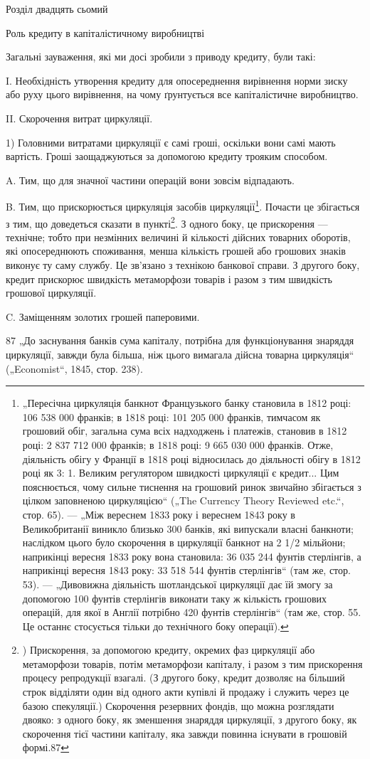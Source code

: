 Розділ двадцять сьомий

Роль кредиту в капіталістичному виробництві

Загальні зауваження, які ми досі зробили з приводу кредиту,
були такі:

I. Необхідність утворення кредиту для опосереднення вирівнення норми зиску або руху цього
вирівнення, на чому ґрунтується все капіталістичне виробництво.

II. Скорочення витрат циркуляції.

1) Головними витратами циркуляції є самі гроші, оскільки
вони самі мають вартість. Гроші заощаджуються за допомогою
кредиту трояким способом.

A. Тим, що для значної частини операцій вони зовсім відпадають.

B. Тим, що прискорюється циркуляція засобів циркуляції\footnote{
„Пересічна циркуляція банкнот Французького банку становила в 1812 році:
106 538 000 франків; в 1818 році: 101 205 000 франків, тимчасом як грошовий обіг,
загальна сума всіх надходжень і платежів, становив в 1812 році: 2 837 712 000
франків; в 1818 році: 9 665 030 000 франків. Отже, діяльність обігу у Франції
в 1818 році відносилась до діяльності обігу в 1812 році як 3: 1. Великим регулятором швидкості
циркуляції є кредит... Цим пояснюється, чому сильне тиснення на грошовий ринок звичайно збігається з
цілком заповненою циркуляцією“ („The Currency Theory Reviewed etc.“, стор. 65). — „Між вереснем 1833
року
і вереснем 1843 року в Великобританії виникло близько 300 банків, які випускали власні банкноти;
наслідком цього було скорочення в циркуляції банкнот
на 2 1/2 мільйони; наприкінці вересня 1833 року вона становила: 36 035 244 фунтів стерлінгів, а
наприкінці вересня 1843 року: 33 518 544 фунтів стерлінгів“
(там же, стор. 53). — „Дивовижна діяльність шотландської циркуляції дає їй
змогу за допомогою 100 фунтів стерлінгів виконати таку ж кількість грошових
операцій, для якої в Англії потрібно 420 фунтів стерлінгів“ (там же, стор. 55.
Це останнє стосується тільки до технічного боку операції).
}.
Почасти це збігається з тим, що доведеться сказати в пункті\footnote{
) Прискорення, за допомогою кредиту, окремих фаз циркуляції
або метаморфози товарів, потім метаморфози капіталу, і разом
з тим прискорення процесу репродукції взагалі. (З другого боку,
кредит дозволяє на більший строк відділяти один від одного акти
купівлі й продажу і служить через це базою спекуляції.) Скорочення резервних фондів, що можна
розглядати двояко: з одного
боку, як зменшення знаряддя циркуляції, з другого боку, як скорочення тієї частини капіталу, яка
завжди повинна існувати в грошовій формі.87
}.
З одного боку, це прискорення — технічне; тобто при незмінних
величині й кількості дійсних товарних оборотів, які опосереднюють споживання, менша кількість грошей
або грошових знаків
виконує ту саму службу. Це зв’язано з технікою банкової справи.
З другого боку, кредит прискорює швидкість метаморфози товарів і разом з тим швидкість грошової
циркуляції.

C. Заміщенням золотих грошей паперовими.

87 „До заснування банків сума капіталу, потрібна для функціонування знаряддя циркуляції, завжди була
більша, ніж цього вимагала дійсна товарна
циркуляція“ („Economist“, 1845, стор. 238).
\parbreak{}  %
